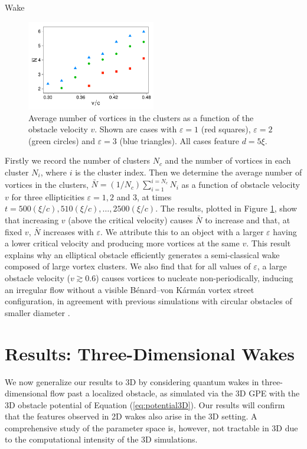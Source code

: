 \begin{chapter}{\label{cha:wake}Wake}
\begin{figure}
\centering
\includegraphics[width=0.5\textwidth]{wake/figure6}
\caption{\label{fig:Svslocal2} Average number of vortices in the clusters as a function of the obstacle velocity $v$.  Shown are cases with $\varepsilon=1$ (red squares),  $\varepsilon=2$ (green circles) and $\varepsilon=3$ (blue triangles).  All cases feature $d=5\xi$.}
\end{figure}

Firstly we record the number of clusters $N_c$ and the number of vortices in each cluster $N_i$, where $i$ is the cluster index. Then we determine the average number of vortices in the clusters, $\bar{N} = (1/N_c) \sum_{i=1}^{i=N_c} N_i$ as a function of obstacle velocity $v$ for three ellipticities $\varepsilon=1, 2$ and $3$, at times $t=500(\xi/c),510(\xi/c),\ldots,2500(\xi/c)$. The results, plotted in Figure \ref{fig:Svslocal2}, show that increasing $v$ (above the critical velocity) causes $\bar{N}$ to increase and that, at fixed $v$, $\bar{N}$ increases with $\varepsilon$. We attribute this to an object with a larger $\varepsilon$ having a lower critical velocity and producing more vortices at the same $v$.  This result explains why an elliptical obstacle efficiently generates a semi-classical wake composed of large vortex clusters. We also find that for all values of $\varepsilon$, a large obstacle velocity ($v\gtrsim0.6$) causes vortices to nucleate non-periodically, inducing an irregular flow without a visible B\'enard--von K\'arm\'an vortex street configuration, in agreement with previous simulations with circular obstacles of smaller diameter \cite{saito10}.

\section{Results: Three-Dimensional Wakes}
We now generalize our results to 3D by considering quantum wakes in three-dimensional flow past a localized obstacle, as simulated via the 3D GPE with the 3D obstacle potential of Equation (\ref{eq:potential3D}).  Our results will confirm that the features observed in 2D wakes also arise in the 3D setting.  A comprehensive study of the parameter space is, however, not tractable in 3D due to the computational intensity of the 3D simulations.


\end{chapter}
